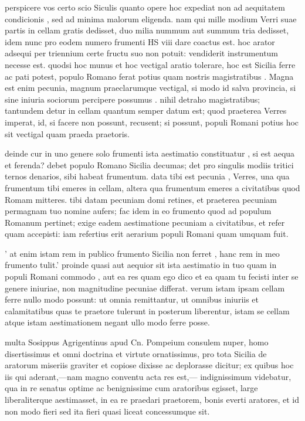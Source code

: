  perspicere vos certo scio Siculis quanto opere hoc expediat non ad aequitatem condicionis , sed ad minima malorum eligenda. nam qui mille modium Verri suae partis in cellam gratis dedisset, duo milia nummum aut summum tria dedisset, idem nunc pro eodem numero frumenti HS viii dare coactus est. hoc arator adsequi per triennium certe fructu suo non potuit: vendiderit instrumentum necesse est. quodsi hoc munus et hoc vectigal aratio tolerare, hoc est Sicilia ferre ac pati potest, populo Romano ferat potius quam nostris magistratibus . Magna est enim pecunia, magnum praeclarumque vectigal, si modo id salva provincia, si sine iniuria sociorum percipere possumus . nihil detraho magistratibus; tantundem detur in cellam quantum semper datum est; quod praeterea Verres imperat, id, si facere non possunt, recusent; si possunt, populi Romani potius hoc sit vectigal quam praeda praetoris.

 deinde cur in uno genere solo frumenti ista aestimatio constituatur , si est aequa et ferenda? debet populo Romano Sicilia decumas; det pro singulis modiis tritici ternos denarios, sibi habeat frumentum. data tibi est pecunia , Verres, una qua frumentum tibi emeres in cellam, altera qua frumentum emeres a civitatibus quod Romam mitteres. tibi datam pecuniam domi retines, et praeterea pecuniam permagnam tuo nomine aufers; fac idem in eo frumento quod ad populum Romanum pertinet; exige eadem aestimatione pecuniam a civitatibus, et refer quam accepisti: iam refertius erit aerarium populi Romani quam umquam fuit.

 ' at enim istam rem in publico frumento Sicilia non ferret , hanc rem in meo frumento tulit.' proinde quasi aut aequior sit ista aestimatio in tuo quam in populi Romani commodo , aut ea res quam ego dico et ea quam tu fecisti inter se genere iniuriae, non magnitudine pecuniae differat. verum istam ipsam cellam ferre nullo modo possunt: ut omnia remittantur, ut omnibus iniuriis et calamitatibus quas te praetore tulerunt in posterum liberentur, istam se cellam atque istam aestimationem negant ullo modo ferre posse.

 multa Sosippus Agrigentinus apud Cn. Pompeium consulem nuper, homo disertissimus et omni doctrina et virtute ornatissimus, pro tota Sicilia de aratorum miseriis graviter et copiose dixisse ac deplorasse dicitur; ex quibus hoc iis qui aderant,—nam magno conventu acta res est,— indignissimum videbatur, qua in re senatus optime ac benignissime cum aratoribus egisset, large liberaliterque aestimasset, in ea re praedari praetorem, bonis everti aratores, et id non modo fieri sed ita fieri quasi liceat concessumque sit.

